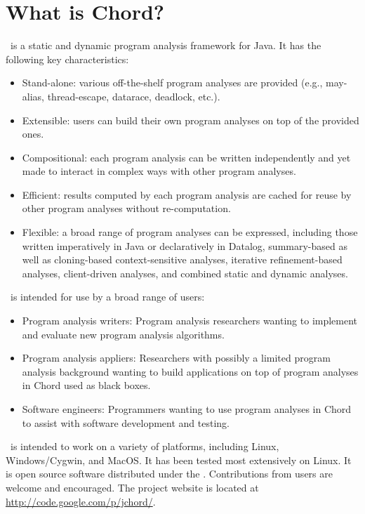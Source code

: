 \section{What is Chord?}
\label{sec:whatis-chord}

\Chord\ is a static and dynamic program analysis framework for Java.
It has the following key characteristics:

\begin{itemize}
\item
Stand-alone: various off-the-shelf program analyses are provided (e.g., may-alias, thread-escape, datarace, deadlock, etc.).
\item
Extensible: users can build their own program analyses on top of the provided ones.
\item
Compositional: each program analysis can be written independently and yet made to interact in complex ways with other program analyses.
\item
Efficient: results computed by each program analysis are cached for reuse by other program analyses without re-computation.
\item
Flexible: a broad range of program analyses can be expressed, including those
written imperatively in Java or declaratively in Datalog, summary-based as well as cloning-based context-sensitive analyses,
iterative refinement-based analyses, client-driven analyses, and combined static and dynamic analyses.
\end{itemize}

\Chord\ is intended for use by a broad range of users:

\begin{itemize}
\item
Program analysis writers: Program analysis researchers wanting to implement and evaluate new program analysis algorithms.
\item
Program analysis appliers: Researchers with possibly a limited program analysis background wanting to build applications on
top of program analyses in Chord used as black boxes.
\item
Software engineers: Programmers wanting to use program analyses in Chord to assist with software development and testing.
\end{itemize}

\Chord\ is intended to work on a variety of platforms, including Linux, Windows/Cygwin, and MacOS.
It has been tested most extensively on Linux.
It is open source software distributed under the .
Contributions from users are welcome and encouraged.
The project website is located at \url{http://code.google.com/p/jchord/}.

